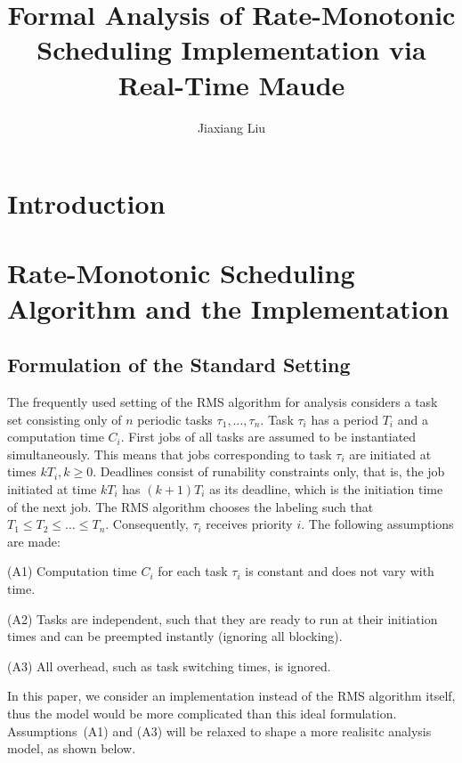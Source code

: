 \documentclass{llncs}
\begin{document}

\title{Formal Analysis of Rate-Monotonic Scheduling Implementation via Real-Time Maude}
\author{Jiaxiang Liu}
\maketitle
\thispagestyle{empty}

\section{Introduction}

\section{Rate-Monotonic Scheduling Algorithm and the Implementation}

\subsection{Formulation of the Standard Setting}
The frequently used setting of the RMS algorithm for analysis
considers a task set consisting only of $n$ periodic tasks
$\tau_1,\ldots,\tau_n$. Task $\tau_i$ has a period $T_i$ and a
computation time $C_i$. First jobs of all tasks are assumed to be
instantiated simultaneously. This means that jobs corresponding to
task $\tau_i$ are initiated at times $kT_i, k\ge 0$. Deadlines consist
of runability constraints only, that is, the job initiated at time
$kT_i$ has $(k+1)T_i$ as its deadline, which is the initiation time of
the next job. The RMS algorithm chooses the labeling such that $T_1\le
T_2\le \ldots \le T_n$. Consequently, $\tau_i$ receives priority
$i$. The following assumptions are made:

(A1) Computation time $C_i$ for each task $\tau_i$ is constant and
does not vary with time.

(A2) Tasks are independent, such that they are ready to run at their
initiation times and can be preempted instantly (ignoring all
blocking).

(A3) All overhead, such as task switching times, is ignored.

In this paper, we consider an implementation instead of the RMS
algorithm itself, thus the model would be more complicated than this
ideal formulation.  Assumptions~(A1) and (A3) will be relaxed to shape a more
realisitc analysis model, as shown below.
\end{document}
